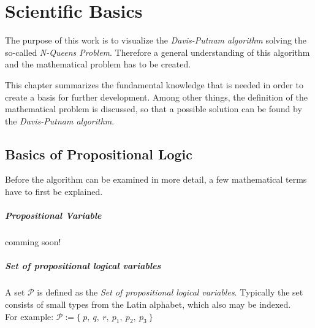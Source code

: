 

\chapter{Scientific Basics}
\label{ch:sciBasics}
The purpose of this work is to visualize the \textit{Davis-Putnam algorithm} solving the so-called \textit{N-Queens Problem}. Therefore a general understanding of this algorithm and the mathematical problem has to be created.

This chapter summarizes the fundamental knowledge that is needed in order to create a basis for further development. Among other things, the definition of the mathematical problem is discussed, so that a possible solution can be found by the \textit{Davis-Putnam algorithm}.

\section{Basics of Propositional Logic}
\label{sec:sciProLogic}
Before the algorithm can be examined in more detail, a few mathematical terms have to first be explained.

\paragraph{Propositional Variable} comming soon!

\paragraph{Set of propositional logical variables}
A set $\mathcal{P}$ is defined as the \emph{Set of propositional logical variables}. Typically the set consists of small types from the Latin alphabet, which also may be indexed.\\
For example: $\mathcal{P} := \{\ p,\ q,\ r,\ p_1,\ p_2,\ p_3\ \}$ 

